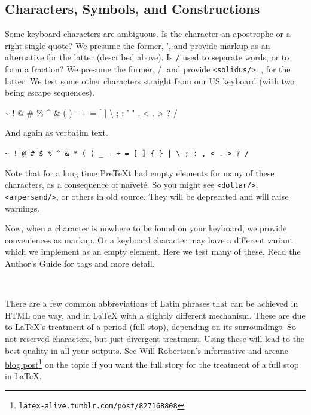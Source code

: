 \documentclass{amsart}
\theoremstyle{plain}%
\theoremstyle{definition}%
\theoremstyle{remark}%
\newcommand{\mono}[1]{\texttt{#1}}
\newcommand{\swungdash}{\raisebox{-2.25ex}{\scalebox{2}{\~{}}}}
\numberwithin{equation}{section}
\begin{document}
\subsection{Characters, Symbols, and Constructions}\label{section-text-paragraphs-8}%
Some keyboard characters are ambiguous.  Is the character \mono{\textquotesingle{}} an apostrophe or a right single quote?  We presume the former, ', and provide markup as an alternative for the latter (described above).  Is \mono{/} used to separate words, or to form a fraction?  We presume the former, \slash{}, and provide \mono{<solidus/>}, \textfractionsolidus{}, for the latter.  We test some other characters straight from our US keyboard (with two being escape sequences).%
\par
\textasciitilde{} \textasciigrave{} ! @ \# \textdollar{} \% \textasciicircum{} \& \textasteriskcentered{} ( ) \textunderscore{} - + = [ ] \textbraceleft{} \textbraceright{} \textbar{} \textbackslash{} ; : ' " , \textless{} . \textgreater{} ? \slash{}%
\par
And again  as verbatim text.%
\par
\mono{\textasciitilde{} \textasciigrave{} ! @ \# \$ \% \textasciicircum{} \& * ( ) \_ - + = [ ] \{ \} | \textbackslash{} ; : \textquotesingle{} \textquotedbl{} , < . > ? /}%
\par
Note that for a long time PreTeXt had empty elements for many of these characters, as a consequence of naïveté.  So you might see \mono{<dollar/>}, \mono{<ampersand/>}, or others in old source.  They will be deprecated and will raise warnings.%
\par
Now, when a character is nowhere to be found on your keyboard, we provide conveniences as markup.  Or a keyboard character may have a different variant which we implement as an empty element.  Here we test many of these.  Read the Author's Guide for tags and more detail.%
\par
\textcopyright{}~~ \textcircledP{}~~ \textcopyleft{}~~ \textregistered{}~~ \texttrademark{}~~ \textservicemark{}~~ \textellipsis{}~~ \textperiodcentered{}~~ \swungdash{}~~ \textperthousand{}~~ \textpilcrow{}~~ \textsection{}~~ \textminus{}~~ \texttimes{}~~ \textfractionsolidus{}~~ \textdiv{}~~ \textpm{}%
\par
There are a few  common abbreviations of Latin phrases that can be achieved in HTML one way, and in \LaTeX{} with a slightly different mechanism.  These are due to \LaTeX{}'s treatment of a period (full stop), depending on its surroundings.  So not reserved characters, but just divergent treatment.  Using these will lead to the best quality in all your outputs.  See Will Robertson's informative and arcane \href{http://latex-alive.tumblr.com/post/827168808/correct-punctuation-spaces}{blog post}\footnote{\nolinkurl{latex-alive.tumblr.com/post/827168808}\label{section-text-paragraphs-8-9-4}} on the topic if you want the full story for the treatment of a full stop in \LaTeX{}.%
\end{document}
